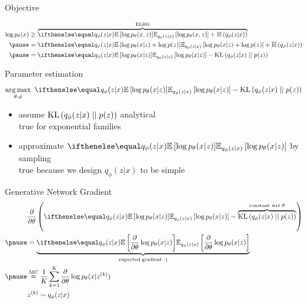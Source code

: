\begin{frame}[plain]{Objective}

\begin{equation*}
\begin{aligned}
\log p_\theta(x) &\geq \overbrace{\E[q_\phi(z|x)]{\log p_\theta(x,z)} + \Ent{q_\phi(z|x)}}^{\ELBO} \\ 
\pause
&= \E[q_\phi(z|x)]{\log p_\theta(x|z) + \log p(z)} + \Ent{q_\phi(z|x)} \\ \pause
&= \E[q_\phi(z|x)]{\log p_\theta(x|z)} - \KL{q_\phi(z|x)}{p(z)}
\end{aligned}
\end{equation*}

\pause

Parameter estimation
\begin{equation*}
\argmax_{\theta,\phi} ~ \E[q_\phi(z|x)]{\log p_\theta(x|z)} - \KL{q_\phi(z|x)}{p(z)}
\end{equation*}

\pause

\begin{itemize}
	\item assume $\operatorname{KL}\left(q_\phi(z|x)\mid\mid p(z)\right)$  analytical\\
	true for exponential families \pause
	\item approximate $\E[q_\phi(z|x)]{\log p_\theta(x|z)}$ by sampling\\
	true because we design $q_\phi(z|x)$ to be simple
\end{itemize}


\end{frame}

\begin{frame}[plain]{Generative Network Gradient}
\begin{equation*}
\begin{aligned}
&\pdv{\theta} \left( \E[q_\phi(z|x)]{\log p_\theta(x|z)} - \overbrace{\KL{q_\phi(z|x)}{p(z)}}^{\text{constant wrt }\theta} \right) \\ \pause 
&=\underbrace{\E[q_\phi(z|x)]{\pdv{\theta}\log p_\theta(x|z)}}_{\text{expected gradient :)}} \\ \pause
&\overset{\text{MC}}{\approx} \frac{1}{K}\sum_{k=1}^{K}
\pdv{\theta} \log p_\theta(x|z^{(k)}) \\
&z^{(k)} \sim q_\phi(z|x)
\end{aligned}
\end{equation*}
\pause
{}
\end{frame}

